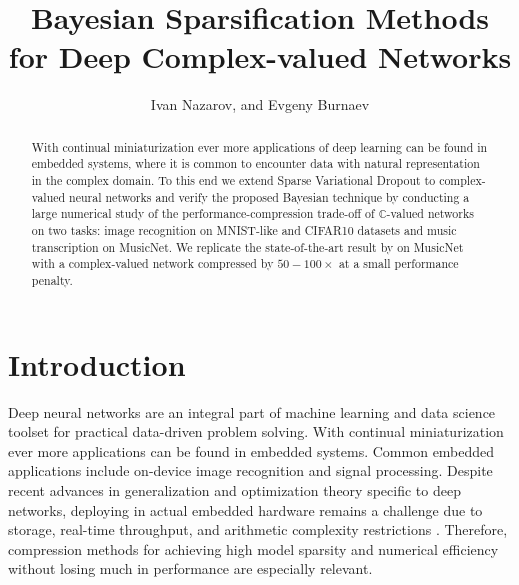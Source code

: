 \documentclass[a4paper,10pt,twocolumn]{article}
\title{Bayesian Sparsification Methods for Deep Complex-valued Networks}
\author{Ivan Nazarov, and Evgeny Burnaev}
\newcommand{\cplx}{\mathbb{C}}
\begin{document}
\maketitle

\begin{abstract}
With continual miniaturization ever more applications of deep learning can be found
in embedded systems, where it is common to encounter data with natural representation
in the complex domain. To this end we extend Sparse Variational Dropout to complex-valued
neural networks and verify the proposed Bayesian technique by conducting a large numerical
study of the performance-compression trade-off of $\cplx$-valued networks on two tasks:
image recognition on MNIST-like and CIFAR10 datasets and music transcription on MusicNet.
We replicate the state-of-the-art result by \citet{trabelsi_deep_2018} on MusicNet with
a complex-valued network compressed by $50-100\times$ at a small performance penalty.
\end{abstract}

\section{Introduction} %
\label{sec:introduction}

Deep neural networks are an integral part of machine learning and data science toolset
for practical data-driven problem solving. With continual miniaturization ever more
applications can be found in embedded systems. Common embedded applications include
on-device image recognition and signal processing. Despite recent advances in generalization
and optimization theory specific to deep networks, deploying in actual embedded hardware
remains a challenge due to storage, real-time throughput, and arithmetic complexity
restrictions \citep{han_learning_2015}. Therefore, compression methods for achieving high
model sparsity and numerical efficiency without losing much in performance are especially
relevant.
\end{document}

